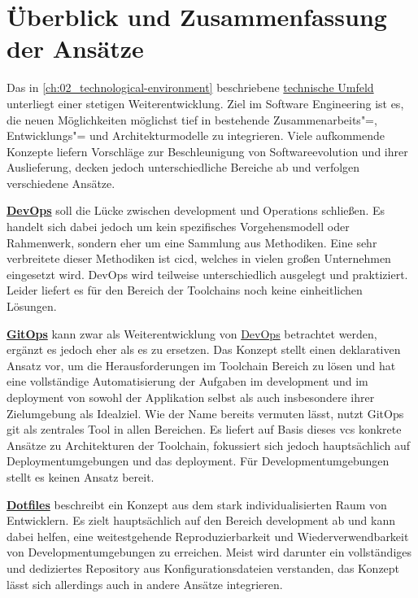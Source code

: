 \section{Überblick und Zusammenfassung der Ansätze}
\label{sec:03-06_overview-and-summary-of-approaches}

Das in \autoref{ch:02_technological-environment} beschriebene \hyperref[ch:02_technological-environment]{technische Umfeld} unterliegt einer stetigen Weiterentwicklung. Ziel im Software Engineering ist es, die neuen Möglichkeiten möglichst tief in bestehende Zusammenarbeits"=, Entwicklungs"= und Architekturmodelle zu integrieren. Viele aufkommende Konzepte liefern Vorschläge zur Beschleunigung von Softwareevolution und ihrer Auslieferung, decken jedoch unterschiedliche Bereiche ab und verfolgen verschiedene Ansätze.

\textbf{\hyperref[sec:03-01_introduction-to-devops]{DevOps}} soll die Lücke zwischen \Gls{development} und Operations schließen. Es handelt sich dabei jedoch um kein spezifisches Vorgehensmodell oder Rahmenwerk, sondern eher um eine Sammlung aus Methodiken. Eine sehr verbreitete dieser Methodiken ist \acrfull{cicd}, welches in vielen großen Unternehmen eingesetzt wird. DevOps wird teilweise unterschiedlich ausgelegt und praktiziert. Leider liefert es für den Bereich der Toolchains noch keine einheitlichen Lösungen.

\textbf{\hyperref[sec:03-03_gitops-as-further-evolution]{GitOps}} kann zwar als Weiterentwicklung von \hyperref[sec:03-01_introduction-to-devops]{DevOps} betrachtet werden, ergänzt es jedoch eher als es zu ersetzen. Das Konzept stellt einen deklarativen Ansatz vor, um die Herausforderungen im Toolchain Bereich zu lösen und hat eine vollständige Automatisierung der Aufgaben im \Gls{development} und im \Gls{deployment} von sowohl der Applikation selbst als auch insbesondere ihrer Zielumgebung als Idealziel. Wie der Name bereits vermuten lässt, nutzt GitOps \Gls{git} als zentrales Tool in allen Bereichen. Es liefert auf Basis dieses \Gls{vcs} konkrete Ansätze zu Architekturen der Toolchain, fokussiert sich jedoch hauptsächlich auf Deploymentumgebungen und das \Gls{deployment}. Für Developmentumgebungen stellt es keinen Ansatz bereit.

\textbf{\hyperref[sec:03-04_idea-of-dotfiles]{Dotfiles}} beschreibt ein Konzept aus dem stark individualisierten Raum von Entwicklern. Es zielt hauptsächlich auf den Bereich \Gls{development} ab und kann dabei helfen, eine weitestgehende Reproduzierbarkeit und Wiederverwendbarkeit von Developmentumgebungen zu erreichen. Meist wird darunter ein vollständiges und dediziertes Repository aus Konfigurationsdateien verstanden, das Konzept lässt sich allerdings auch in andere Ansätze integrieren.

